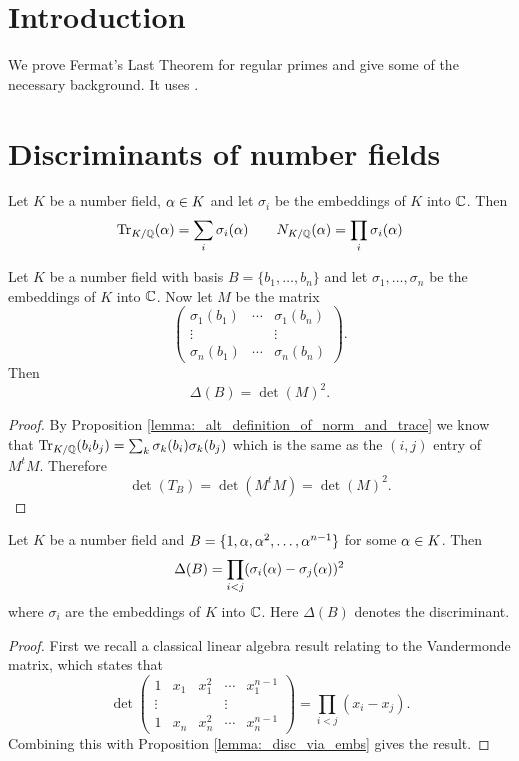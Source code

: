 	\maketitle
\tableofcontents
\section{Introduction}
We prove Fermat's Last Theorem for regular primes and give some of the necessary background. It uses \cite{Samuel,marcus,washington}.	

\section{Discriminants of number fields}	
\begin{lemma}\label{lemma:_alt_definition_of_norm_and_trace}
	Let $K$ be a number field, $\alpha \in K$ and let $\sigma_i$ be the embeddings of $K$ into $\mathbb{C}$. Then \[\operatorname{Tr}_{K/\mathbb{Q}}(\alpha) =\sum_i \sigma_i(\alpha) \qquad N_{K/\mathbb{Q}}(\alpha)=\prod_i \sigma_i(\alpha)  \]
\end{lemma}

\begin{lemma}\label{lemma:_disc_via_embs}
	Let $K$ be a number field with basis $B=\{b_1,\dots,b_n\}$ and let $\sigma_1,\dots,\sigma_n$ be the embeddings of $K$ into $\mathbb{C}$. Now let $M$ be the matrix  \[\left (\begin{matrix} \sigma_1(b_1) &\cdots& \sigma_1(b_n)\\ \vdots & & \vdots \\  \sigma_n(b_1) &\cdots& \sigma_n(b_n)
	\end{matrix} \right ).\] Then \[\Delta(B)=\det(M)^2.\]
\end{lemma}


\begin{proof}
	By Proposition \ref{lemma:_alt_definition_of_norm_and_trace} we know that  $\operatorname{Tr}_{K/\mathbb{Q}}(b_i b_j)= \sum_k \sigma_k(b_i)\sigma_k(b_j)$ which is the same as the $(i,j)$ entry of $M^t M$. Therefore \[\det(T_B)=\det(M^t M)=\det(M)^2.\]
\end{proof}

\begin{lemma}\label{lemma:_disc_of_prim_elt_basis}
	Let $K$ be a number field and $B=\{1,\alpha,\alpha^2,\dots,\alpha^{n-1}\}$ for some $\alpha \in K$. Then \[\Delta(B)=\prod_{i < j} (\sigma_i(\alpha)-\sigma_j(\alpha))^2\] where $\sigma_i$ are the embeddings of $K $ into $\mathbb{C}$. Here $\Delta(B)$ denotes the discriminant.
\end{lemma}
\begin{proof}
	First we recall a classical linear algebra result relating to the Vandermonde matrix, which states that  \[\det \left (\begin{matrix} 1 & x_1& x_1^2&\cdots&x_1^{n-1} \\ \vdots & & & \vdots \\   1 & x_n& x_n^2&\cdots&x_n^{n-1}
	\end{matrix} \right ) =\prod_{i<j} (x_i-x_j).\] Combining this with Proposition \ref{lemma:_disc_via_embs} gives the result.
\end{proof}

